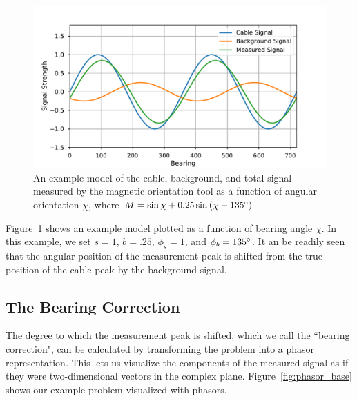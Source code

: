 \documentclass[paper=a4, fontsize=11pt]{scrartcl}
\numberwithin{equation}{section}		%
\numberwithin{figure}{section}			%
\numberwithin{table}{section}				%
\begin{document}
\begin{appendices}
\begin{figure}[h!]
  \caption{An example model of the cable, background, and total signal measured by the magnetic orientation tool as a function of angular orientation $\chi$, where $M = \sin\chi + 0.25 \sin\left(\chi -135\degree\right)$
  }
  \label{fig:sigs_vs_bearing}
  \centering
  \includegraphics[width=1.0\textwidth]{figures/sigs_vs_bearing.pdf}
\end{figure}

Figure~\ref{fig:sigs_vs_bearing} shows an example model plotted as a function of bearing angle $\chi$.  In this example, we set $s=1$, $b=.25$, $\phi_s=1$, and $\phi_b=135\degree$. It an be readily seen that the angular position of the measurement peak is shifted from the true position of the cable peak by the background signal.  

\subsection{The Bearing Correction}
The degree to which the measurement peak is shifted, which we call the ``bearing correction", can be calculated by transforming the problem into a phasor representation.  This lets us visualize the components of the measured signal as if they were two-dimensional vectors in the complex plane. Figure~\ref{fig:phasor_base} shows our example problem visualized with phasors.


\end{appendices}
\end{document}
